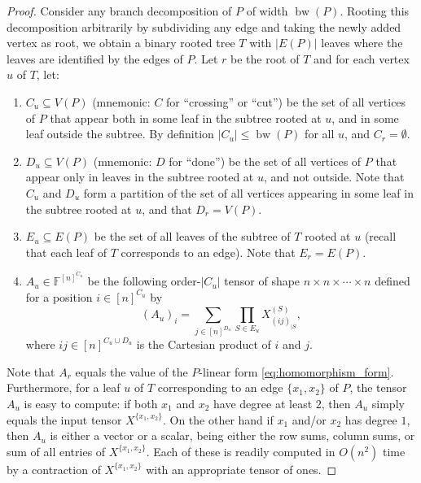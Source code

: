 \documentclass{toc}
\DeclareMathOperator{\bw}{bw}
\newcommand{\F}{\ensuremath{\mathbb{F}}}
\begin{document}
\begin{proof}
  Consider any branch decomposition of $P$ of
  width $\bw(P)$.  Rooting this decomposition arbitrarily by subdividing
  any edge and taking the newly added vertex as root, we obtain a
  binary rooted tree $T$ with $|E(P)|$ leaves where the leaves are
  identified by the edges of $P$.  Let $r$ be the root of $T$ and
  for each vertex $u$ of $T$, let:
  \begin{enumerate}
  \item $C_u \subseteq V(P)$ (mnemonic: $C$ for ``crossing'' or ``cut'') be the set of
    all vertices of $P$ that appear both in some leaf in the subtree
    rooted at $u$, and in some leaf outside the subtree.  By
    definition $|C_u| \le \bw(P)$ for all $u$, and $C_r = \emptyset$.

  \item $D_u \subseteq V(P)$ (mnemonic: $D$ for ``done'') be the set of all vertices of $P$ that
    appear only in leaves in the subtree rooted at $u$, and not
    outside.  Note that $C_u$ and $D_u$ form a partition of the set of
    all vertices appearing in some leaf in the subtree rooted at $u$,
    and that $D_r = V(P)$.

  \item $E_u \subseteq E(P)$ be the set of all leaves of the subtree
    of $T$ rooted at $u$ (recall that each leaf of $T$ corresponds to
    an edge).  Note that $E_r = E(P)$.

  \item $A_u \in \F^{[n]^{C_u}}$ be the following %
%
order-$|C_u|$
%
   tensor
    of shape $n \times n \times \cdots \times n$ defined for a position $i \in [n]^{C_u}$ by
    \[
    (A_u)_i = \sum_{j \in [n]^{D_u}} \prod_{S \in E_u} X^{(S)}_{(ij)_{|S}},
    \]
    where $ij \in [n]^{C_u \cup D_u}$ is the Cartesian product of $i$
    and $j$.
  \end{enumerate}

  Note that $A_r$ equals the value of the $P$-linear
  form \eqref{eq:homomorphism_form}.
  Furthermore, for a leaf $u$ of $T$ corresponding to an edge $\{x_1, x_2\}$ of
  $P$,
  the tensor  %
  $A_u$ is easy to compute: if %
  both $x_1$ and $x_2$  %
  have degree
  at least $2$, then $A_u$ simply equals the input tensor
  $X^{\{x_1,x_2\}}$.  On the other hand if $x_1$ and/or $x_2$ has
  degree $1$, then $A_u$ is either a vector or a scalar, being either
  the row sums, column sums, or sum of all entries of
  $X^{\{x_1,x_2\}}$.  Each of these is readily computed in $O(n^2)$
  time by a contraction of $X^{\{x_1,x_2\}}$ with an appropriate
  tensor of ones.


\end{proof}
\end{document}
